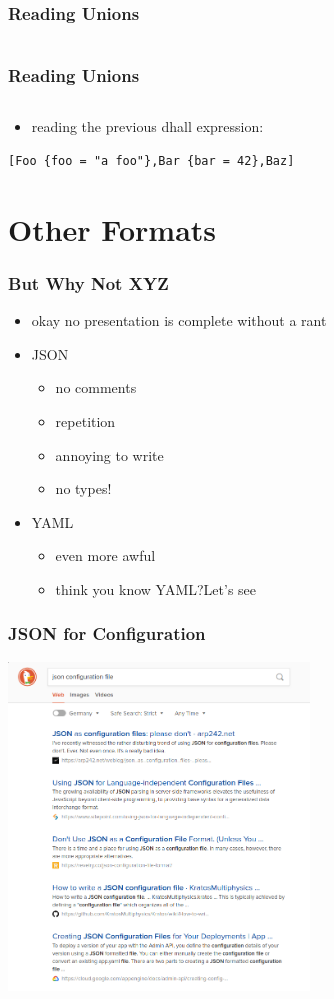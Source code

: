\documentclass{beamer}
\begin{document}
\begin{frame}
  \frametitle{Reading Unions}
  \inputminted{haskell}{dhall/unions.dhall}
\end{frame}

\begin{frame}[fragile]
  \frametitle{Reading Unions}
  \inputminted{haskell}{snippets/unions.hs}
  \begin{itemize}
  \item reading the previous dhall expression:
  \end{itemize}
  \begin{verbatim}
[Foo {foo = "a foo"},Bar {bar = 42},Baz]
  \end{verbatim}
\end{frame}

\section{Other Formats}

\begin{frame}
  \frametitle{But Why Not XYZ}
  \begin{itemize}
  \item okay no presentation is complete without a rant
  \item JSON
    \begin{itemize}
    \item no comments
    \item repetition
    \item annoying to write
    \item no types!
    \end{itemize}
  \item YAML
    \begin{itemize}
    \item even more awful
    \item think you know YAML?\@ Let's see
    \end{itemize}
  \end{itemize}
\end{frame}

\begin{frame}
  \frametitle{JSON for Configuration}
  \begin{center}
    \includegraphics[width=0.6\textwidth]{static-images/duckduckgo-dont-use-json.png}
  \end{center}
\end{frame}
\end{document}
